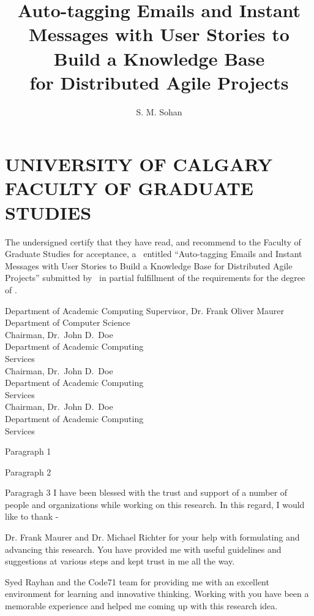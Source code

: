 \documentclass{ucalgthes1}
\title{Auto-tagging Emails and Instant Messages with User Stories to Build a Knowledge Base\\ 
\bigskip for Distributed Agile Projects}
\author{S. M. Sohan}
\newcommand{\thesistitle}{Auto-tagging Emails and Instant Messages with User Stories to Build a Knowledge Base for Distributed Agile Projects}
\begin{document}
\makethesistitle
{}     %
\setcounter{page}{1}
\chapter*{UNIVERSITY OF CALGARY \\ FACULTY OF GRADUATE STUDIES}
\thispagestyle{empty}
The undersigned certify that they have read, and recommend
to the Faculty of Graduate Studies for acceptance, a \Thesis\ entitled
``\thesistitle'' submitted by \Author\
in partial fulfillment of the requirements for the degree of
\Degree.\\

%
%
\begin{signing}{Department of Academic Computing}
\signline
Supervisor, Dr. Frank Oliver Maurer \\
Department of Computer Science \\

\signline
Chairman, Dr.~John D.~Doe \\
Department of Academic Computing \\
Services  \\
\signline
Chairman, Dr.~John D.~Doe \\
Department of Academic Computing \\
Services  \\
\signline
Chairman, Dr.~John D.~Doe \\
Department of Academic Computing \\
Services  \\
\end{signing}
%
\newpage
{}
{} 
Paragraph 1

Paragraph 2

Paragragh 3
\newpage
{}
{}
I have been blessed with the trust and support of a number of people and organizations while working on this research. In this regard, I would like to thank -

Dr. Frank Maurer and Dr. Michael Richter for your help with formulating and advancing this research. You have provided me with useful guidelines and suggestions at various steps and kept trust in me all the way.

Syed Rayhan and the Code71 team for providing me with an excellent environment for learning and innovative thinking. Working with you have been a memorable experience and helped me coming up with this research idea.
\end{document}
